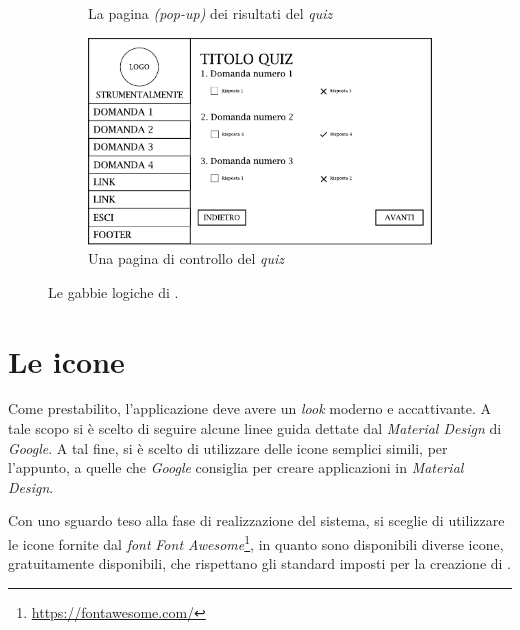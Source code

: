 \begin{figure}[H]
\begin{subfigure}[t]{0.5\textwidth}
		\caption{La pagina \emph{(pop-up)} dei risultati del \emph{quiz}}
	\end{subfigure}
	\begin{subfigure}[t]{0.5\textwidth}
		\centering
		\includegraphics[width=\textwidth]{gabbie_logiche/Controlla_Quiz}
		\caption{Una pagina di controllo del \emph{quiz}}
	\end{subfigure}
	\label{fig:gabbie-logiche}
	\caption{Le gabbie logiche di \ProjectTitle{}.}
\end{figure}

\section{Le icone}

Come prestabilito, l'applicazione deve avere un \emph{look} moderno e accattivante. A tale scopo si è scelto di seguire alcune linee guida dettate dal \emph{Material Design} di \emph{Google}. A tal fine, si è scelto di utilizzare delle icone semplici simili, per l'appunto, a quelle che \emph{Google} consiglia per creare applicazioni in \emph{Material Design}. 

Con uno sguardo teso alla fase di realizzazione del sistema, si sceglie di utilizzare le icone fornite dal \emph{font} \emph{Font Awesome}\footnote{\url{https://fontawesome.com/}}, in quanto sono disponibili diverse icone, gratuitamente disponibili, che rispettano gli standard imposti per la creazione di \ProjectTitle{}.